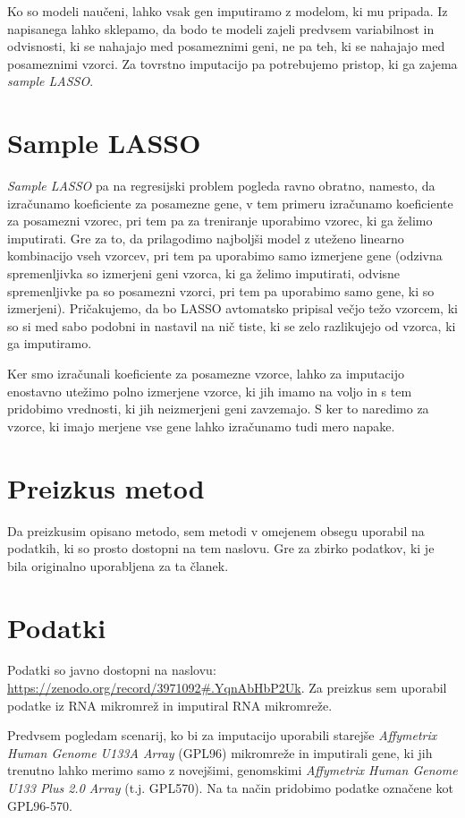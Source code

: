 \documentclass[onecolumn]{report}
\begin{document}
Ko so modeli naučeni, lahko vsak gen imputiramo z modelom, ki mu pripada. Iz napisanega lahko sklepamo, da bodo te modeli zajeli predvsem variabilnost in odvisnosti, ki se nahajajo med posameznimi geni, ne pa teh, ki se nahajajo med posameznimi vzorci. Za tovrstno imputacijo pa potrebujemo pristop, ki ga zajema \emph{sample LASSO}.

\section*{Sample LASSO}

\emph{Sample LASSO} pa na regresijski problem pogleda ravno obratno, namesto, da izračunamo koeficiente za posamezne gene, v tem primeru izračunamo koeficiente za posamezni vzorec, pri tem pa za treniranje uporabimo vzorec, ki ga želimo imputirati. Gre za to, da prilagodimo najboljši model z uteženo linearno kombinacijo vseh vzorcev, pri tem pa uporabimo samo izmerjene gene (odzivna spremenljivka so izmerjeni geni vzorca, ki ga želimo imputirati, odvisne spremenljivke pa so posamezni vzorci, pri tem pa uporabimo samo gene, ki so izmerjeni). Pričakujemo, da bo LASSO avtomatsko pripisal večjo težo vzorcem, ki so si med sabo podobni in nastavil na nič tiste, ki se zelo razlikujejo od vzorca, ki ga imputiramo.

Ker smo izračunali koeficiente za posamezne vzorce, lahko za imputacijo enostavno utežimo polno izmerjene vzorce, ki jih imamo na voljo in s tem pridobimo vrednosti, ki jih neizmerjeni geni zavzemajo. S ker to naredimo za vzorce, ki imajo merjene vse gene lahko izračunamo tudi mero napake.

\section{Preizkus metod}

Da preizkusim opisano metodo, sem metodi v omejenem obsegu uporabil na podatkih, ki so prosto dostopni na tem naslovu. Gre za zbirko podatkov, ki je bila originalno uporabljena za ta članek. 

\section*{Podatki}

Podatki so javno dostopni na naslovu: \url{https://zenodo.org/record/3971092#.YqnAbHbP2Uk}. Za preizkus sem uporabil podatke iz RNA mikromrež in imputiral RNA mikromreže. 

Predvsem pogledam scenarij, ko bi za imputacijo uporabili starejše \emph{Affymetrix Human Genome U133A Array} (GPL96) mikromreže in imputirali gene, ki jih trenutno lahko merimo samo z novejšimi, genomskimi \emph{Affymetrix Human Genome U133 Plus 2.0 Array} (t.j. GPL570). Na ta način pridobimo podatke označene kot GPL96-570.
\end{document}
